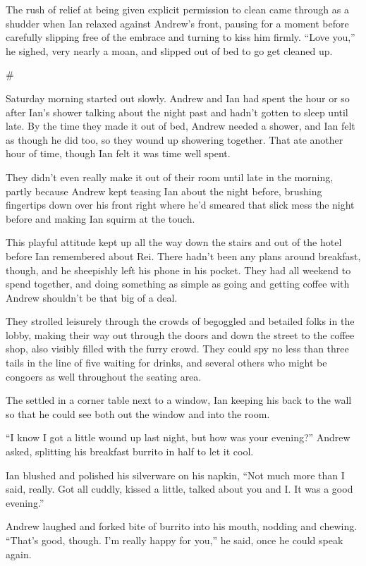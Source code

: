\documentclass[12pt,letterpaper,oneside]{memoir}
\newcommand\secdiv{
  \begin{center}
    \#
  \end{center}
}
\begin{document}
  The rush of relief at being given explicit permission to clean came through as a shudder when Ian relaxed against Andrew's front, pausing for a moment before carefully slipping free of the embrace and turning to kiss him firmly. ``Love you,'' he sighed, very nearly a moan, and slipped out of bed to go get cleaned up.

  \secdiv

  Saturday morning started out slowly. Andrew and Ian had spent the hour or so after Ian's shower talking about the night past and hadn't gotten to sleep until late. By the time they made it out of bed, Andrew needed a shower, and Ian felt as though he did too, so they wound up showering together. That ate another hour of time, though Ian felt it was time well spent.

  They didn't even really make it out of their room until late in the morning, partly because Andrew kept teasing Ian about the night before, brushing fingertips down over his front right where he'd smeared that slick mess the night before and making Ian squirm at the touch.

  This playful attitude kept up all the way down the stairs and out of the hotel before Ian remembered about Rei. There hadn't been any plans around breakfast, though, and he sheepishly left his phone in his pocket. They had all weekend to spend together, and doing something as simple as going and getting coffee with Andrew shouldn't be that big of a deal.

  They strolled leisurely through the crowds of begoggled and betailed folks in the lobby, making their way out through the doors and down the street to the coffee shop, also visibly filled with the furry crowd. They could spy no less than three tails in the line of five waiting for drinks, and several others who might be congoers as well throughout the seating area.

  The settled in a corner table next to a window, Ian keeping his back to the wall so that he could see both out the window and into the room.

  ``I know I got a little wound up last night, but how was your evening?'' Andrew asked, splitting his breakfast burrito in half to let it cool.

  Ian blushed and polished his silverware on his napkin, ``Not much more than I said, really. Got all cuddly, kissed a little, talked about you and I. It was a good evening.''

  Andrew laughed and forked bite of burrito into his mouth, nodding and chewing. ``That's good, though. I'm really happy for you,'' he said, once he could speak again.
\end{document}
